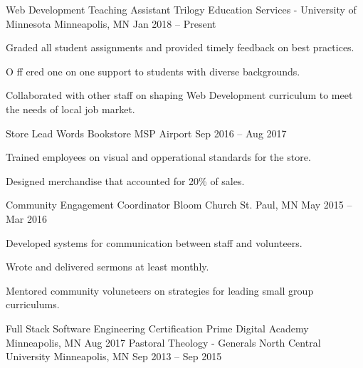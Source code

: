 \documentclass[]{awesome-cv}
\begin{document}
\begin{cventries}
	\cventry
	{Web Development Teaching Assistant}
	{Trilogy Education Services - University of Minnesota}
	{Minneapolis, MN}
	{Jan 2018 – Present}
	{\begin{cvitems}
		\item {Graded all student assignments and provided timely feedback on best practices.}
		\item {O ff ered one on one support to students with diverse backgrounds.}
		\item {Collaborated with other staff on shaping Web Development curriculum to meet the needs of local job market.}
		\end{cvitems}}
	\cventry
	{Store Lead}
	{Words Bookstore}
	{MSP Airport}
	{Sep 2016 – Aug 2017}
	{\begin{cvitems}
		\item {Trained employees on visual and opperational standards for the store.}
		\item {Designed merchandise that accounted for 20\% of sales.}
		\end{cvitems}}
	\cventry
	{Community Engagement Coordinator}
	{Bloom Church}
	{St. Paul, MN}
	{May 2015 – Mar 2016}
	{\begin{cvitems}
		\item {Developed systems for communication between staff and volunteers.}
		\item {Wrote and delivered sermons at least monthly.}
		\item {Mentored community voluneteers on strategies for leading small group curriculums.}
		\end{cvitems}}
\end{cventries}
\begin{cventries}
	\cventry
	{Full Stack Software Engineering Certification}
	{Prime Digital Academy}
	{Minneapolis, MN}
	{Aug 2017}
	{}
	\cventry
	{Pastoral Theology - Generals}
	{North Central University}
	{Minneapolis, MN}
	{Sep 2013 – Sep 2015}
	{}
\end{cventries}

\vspace{-2mm}

\ 
\end{document}
